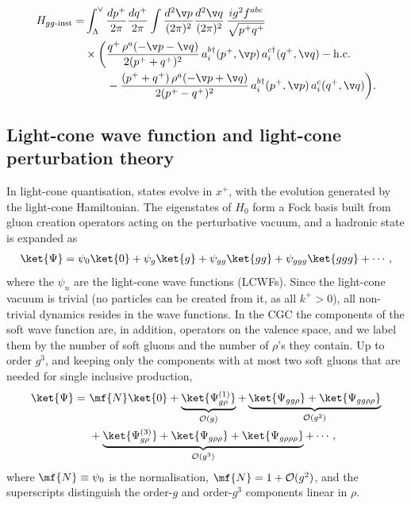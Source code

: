 \begin{align}\label{eq:Hgginst}
H_{gg\text{-inst}}=&\int_{\Lambda}^{\vee}\frac{dp^{+}}{2\pi}\frac{dq^{+}}{2\pi}\int\frac{d^{2}\v p}{(2\pi)^{2}}\frac{d^{2}\v q}{(2\pi)^{2}}\,
\frac{i g^{2} f^{abc}}{\sqrt{p^{+}q^{+}}}\notag\\
&\times\bigg(\frac{q^{+}\,\rho^{a}(-\v p-\v q)}{2(p^{+}+q^{+})^{2}}\,a_{i}^{b\dagger}(p^{+},\v p)\,a_{i}^{c\dagger}(q^{+},\v q)-{\rm h.c.}\notag\\
&\qquad-\frac{(p^{+}+q^{+})\,\rho^{a}(-\v p+\v q)}{2(p^{+}-q^{+})^{2}}\,a_{i}^{b\dagger}(p^{+},\v p)\,a_{i}^{c}(q^{+},\v q)\bigg).
\end{align}

\subsection{Light-cone wave function and light-cone perturbation theory}\label{subsec:LCPT}
In light-cone quantisation, states evolve in $x^{+}$, with the evolution generated by the light-cone
Hamiltonian. The eigenstates of $H_{0}$ form a Fock basis built from gluon creation operators acting
on the perturbative vacuum, and a hadronic state is expanded as
\begin{align}\label{eq:LCexpansion}
\ket{\Psi}=\psi_{0}\ket{0}+\psi_{g}\ket{g}+\psi_{gg}\ket{gg}+\psi_{ggg}\ket{ggg}+\cdots,
\end{align}
where the $\psi_{n}$ are the light-cone wave functions (LCWFs). Since the light-cone vacuum is
trivial (no particles can be created from it, as all $k^{+}>0$), all non-trivial dynamics resides in
the wave functions. In the CGC the components of the soft wave function are, in addition, operators on
the valence space, and we label them by the number of soft gluons and the number of $\rho$'s they
contain. Up to order $g^{3}$, and keeping only the components with at most two soft gluons that are
needed for single inclusive production,
\begin{align}\label{eq:Wfunc}
\ket{\Psi}=\ &\mf{N}\ket{0}+\underbrace{\ket{\Psi_{g\rho}^{(1)}}}_{\mathcal{O}(g)}
+\underbrace{\ket{\Psi_{gg\rho}}+\ket{\Psi_{gg\rho\rho}}}_{\mathcal{O}(g^{2})}\notag\\
&+\underbrace{\ket{\Psi_{g\rho}^{(3)}}+\ket{\Psi_{g\rho\rho}}+\ket{\Psi_{g\rho\rho\rho}}}_{\mathcal{O}(g^{3})}+\cdots,
\end{align}
where $\mf{N}\equiv\psi_{0}$ is the normalisation, $\mf{N}=1+\mathcal{O}(g^{2})$, and the superscripts
distinguish the order-$g$ and order-$g^{3}$ components linear in $\rho$.

